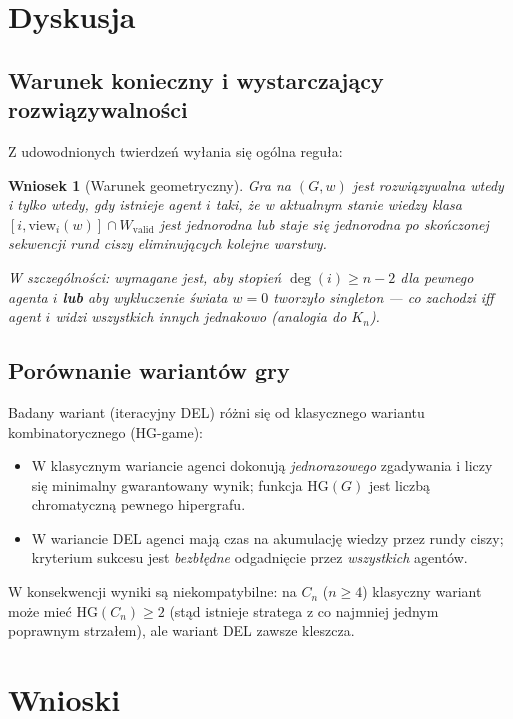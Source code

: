\documentclass[12pt,a4paper]{article}
\theoremstyle{plain}
\newtheorem{corollary}[theorem]{Wniosek}
\theoremstyle{definition}
\theoremstyle{remark}
\newcommand{\HG}{\mathrm{HG}}
\newcommand{\view}{\mathrm{view}}
\newcommand{\Wval}{W_{\mathrm{valid}}}
\begin{document}
\section{Dyskusja}

\subsection{Warunek konieczny i wystarczający rozwiązywalności}

Z udowodnionych twierdzeń wyłania się ogólna reguła:

\begin{corollary}[Warunek geometryczny]
Gra na $(G,w)$ jest rozwiązywalna wtedy i tylko wtedy, gdy istnieje agent $i$ taki, że w aktualnym stanie wiedzy klasa $[i, \view_i(w)] \cap \Wval$ jest jednorodna lub staje się jednorodna po skończonej sekwencji rund ciszy eliminujących kolejne warstwy.

W szczególności: wymagane jest, aby stopień $\deg(i) \ge n - 2$ dla pewnego agenta $i$ \textbf{lub} aby wykluczenie świata $w = 0$ tworzyło singleton — co zachodzi iff agent $i$ widzi wszystkich innych jednakowo (analogia do $K_n$).
\end{corollary}

\subsection{Porównanie wariantów gry}

Badany wariant (iteracyjny DEL) różni się od klasycznego wariantu kombinatorycznego (HG-game):
\begin{itemize}
  \item W klasycznym wariancie agenci dokonują \emph{jednorazowego} zgadywania i liczy się minimalny gwarantowany wynik; funkcja $\HG(G)$ jest liczbą chromatyczną pewnego hipergrafu.
  \item W wariancie DEL agenci mają czas na akumulację wiedzy przez rundy ciszy; kryterium sukcesu jest \emph{bezbłędne} odgadnięcie przez \emph{wszystkich} agentów.
\end{itemize}
W konsekwencji wyniki są niekompatybilne: na $C_n$ ($n \ge 4$) klasyczny wariant może mieć $\HG(C_n) \ge 2$ (stąd istnieje stratega z co najmniej jednym poprawnym strzałem), ale wariant DEL zawsze kleszcza.

\section{Wnioski}
\end{document}
